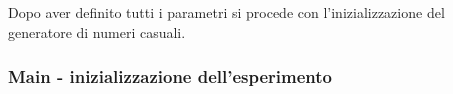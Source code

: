 				Dopo aver definito tutti i parametri si procede con l'inizializzazione del generatore di numeri casuali.
				
				\subsubsection{Main - inizializzazione dell'esperimento}
		
	
		
		
		 